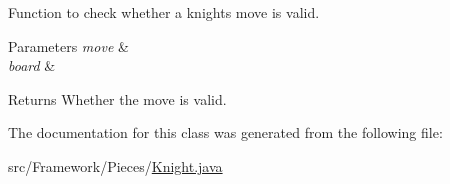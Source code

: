 Function to check whether a knight\textquotesingle{}s move is valid. 
\begin{DoxyParams}{Parameters}
{\em move} & \\
\hline
{\em board} & \\
\hline
\end{DoxyParams}
\begin{DoxyReturn}{Returns}
Whether the move is valid. 
\end{DoxyReturn}


The documentation for this class was generated from the following file\+:\begin{DoxyCompactItemize}
\item 
src/\+Framework/\+Pieces/\hyperlink{_knight_8java}{Knight.\+java}\end{DoxyCompactItemize}
